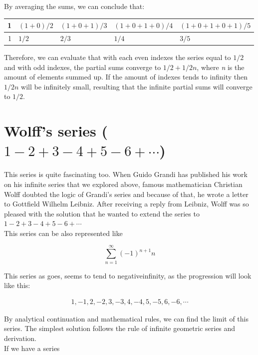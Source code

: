 \documentclass[a4paper]{article}
\begin{document}
By averaging the sums, we can conclude that:

\begin{center}
\begin{tabular}{rllll}
1 & \((1+0)/2\) & \((1+0+1)/3\) & \((1+0+1+0)/4\) & \((1+0+1+0+1)/5\)\\
\hline
1 & \(1/2\) & \(2/3\) & \(1/4\) & \(3/5\)\\
\end{tabular}
\end{center}

Therefore, we can evaluate that with each even indexes the series equal to \(1/2\)
and with odd indexes, the partial sums converge to \(1/2+1/2n\), where \emph{n} is the
amount of elements summed up. If the amount of indexes tends to infinity then
\(1/2n\) will be infinitely small, resulting that the infinite partial sums will
converge to \(1/2\). 

\section{Wolff's series (\(1-2+3-4+5-6+\cdots\))}
\label{sec:org205e67f}

This series is quite fascinating too. When Guido Grandi has published his work
on his infinite series that we explored above, famous mathematician Christian
Wolff doubted the logic of Grandi's series and because of that, he wrote a
letter to Gottfield Wilhelm Leibniz. After receiving a reply \cite{Wolff} from
Leibniz, Wolff was so pleased with the solution that he wanted to extend the
series to \(1-2+3-4+5-6+\cdots\) \\

This series can be also represented like

\begin{equation*}
\sum_{n=1}^\infty (-1)^{n+1}n 
\end{equation*}

This series as goes, seems to tend to negativeinfinity, as the
progression will look like this: 

\begin{align*}
1, -1, 2, -2, 3, -3, 4, -4, 5, -5, 6, -6, \cdots
\end{align*}

By analytical continuation and mathematical rules, we can find the limit of this
series. The simplest solution follows the rule of infinite geometric series and
derivation.\\

If we have a series
\end{document}
